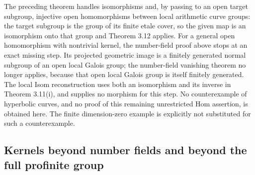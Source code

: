 \begin{remark}
\label{A:local-absolute-hom-open}
The preceding theorem handles isomorphisms and, by passing
to an open target subgroup, injective open homomorphisms
between local arithmetic curve groups: the target subgroup
is the group of its finite etale cover, so the given map is
an isomorphism onto that group and Theorem 3.12 applies.
For a general open homomorphism with nontrivial kernel, the
number-field proof above stops at an exact missing step.
Its projected geometric image is a finitely generated normal
subgroup of an open local Galois group; the number-field
vanishing theorem no longer applies, because that open
local Galois group is itself finitely generated. The local
Isom reconstruction uses both an isomorphism and its inverse
in Theorem 3.11(i), and supplies no morphism for this step.
No counterexample of hyperbolic curves, and no proof of this
remaining unrestricted Hom assertion, is obtained here.
The finite dimension-zero example is explicitly not substituted
for such a counterexample.
\end{remark}

\subsection{Kernels beyond number fields and beyond the full profinite group}

